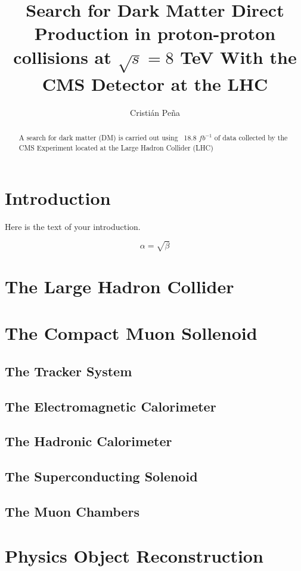 \documentclass[draftfoot,preprint]{cit_thesis}
\begin{document}
\title{Search for Dark Matter Direct Production in proton-proton
  collisions at $\sqrt{s} = 8$ TeV With the CMS Detector at the LHC}
\author{Cristi\'an Pe\~na}

\maketitle

\begin{abstract}
A search for dark matter (DM) is carried out using ~18.8 $fb^{-1}$ of
data collected by the CMS Experiment located at the Large Hadron
Collider (LHC)
\end{abstract}

\section{Introduction}
Here is the text of your introduction.

\begin{equation}
    \label{simple_equation}
    \alpha = \sqrt{ \beta }
\end{equation}

\section{The Large Hadron Collider}
\section{The Compact Muon Sollenoid}
\subsection{The Tracker System}
\subsection{The Electromagnetic Calorimeter}
\subsection{The Hadronic Calorimeter}
\subsection{The Superconducting Solenoid}
\subsection{The Muon Chambers}
\section{Physics Object Reconstruction}
\end{document}
